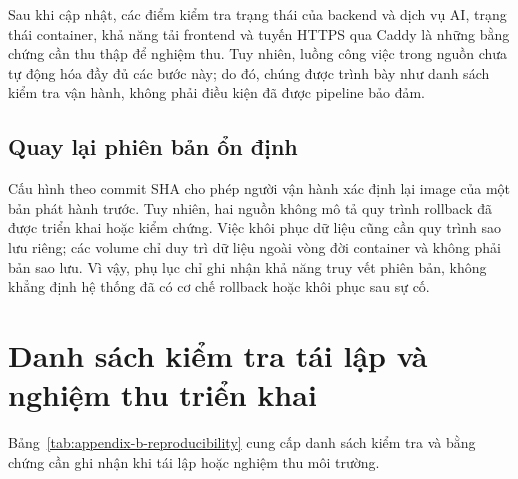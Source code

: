 Sau khi cập nhật, các điểm kiểm tra trạng thái của backend và dịch vụ AI, trạng thái container, khả năng tải frontend và tuyến HTTPS qua Caddy là những bằng chứng cần thu thập để nghiệm thu. Tuy nhiên, luồng công việc trong nguồn chưa tự động hóa đầy đủ các bước này; do đó, chúng được trình bày như danh sách kiểm tra vận hành, không phải điều kiện đã được pipeline bảo đảm.

\subsection{Quay lại phiên bản ổn định}

Cấu hình theo commit SHA cho phép người vận hành xác định lại image của một bản phát hành trước. Tuy nhiên, hai nguồn không mô tả quy trình rollback đã được triển khai hoặc kiểm chứng. Việc khôi phục dữ liệu cũng cần quy trình sao lưu riêng; các volume chỉ duy trì dữ liệu ngoài vòng đời container và không phải bản sao lưu. Vì vậy, phụ lục chỉ ghi nhận khả năng truy vết phiên bản, không khẳng định hệ thống đã có cơ chế rollback hoặc khôi phục sau sự cố.

\section{Danh sách kiểm tra tái lập và nghiệm thu triển khai}
\label{sec:appendix-b-checklist}

Bảng~\ref{tab:appendix-b-reproducibility} cung cấp danh sách kiểm tra và bằng chứng cần ghi nhận khi tái lập hoặc nghiệm thu môi trường.

